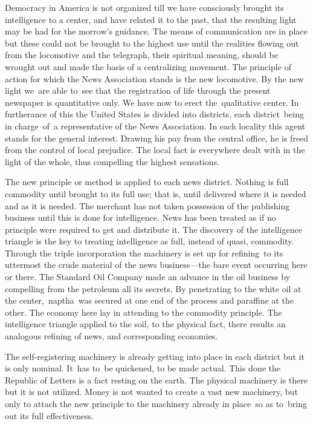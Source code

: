 \documentclass[twoside,symmetric,nobib,justified]{tufte-book}
\begin{document}
Democracy in America is not organized till we have consciously brought
its intelligence to a center, and have related it to the past, that the
resulting light may be had for the morrow's guidance. The means of
communication are in place but these could not be brought to the highest
use until the realities flowing out from the locomotive and the
telegraph, their spiritual meaning, should be wrought out and made the
basis of a centralizing movement. The principle of action for which the
News Association stands is the new locomotive. By the new light we~are
able to~see that the registration of life through the present newspaper
is quantitative only. We have now to erect the~qualitative center. In
furtherance of this the United States is divided into districts, each
district~being in charge~of~a representative of the News Association. In
each locality this agent stands for the general interest. Drawing his
pay from the central office, he is freed from the control of local
prejudice. The local fact is everywhere dealt with in the light of the
whole, thus compelling the highest sensations. ~

The new principle or method is applied to each news district. Nothing is
full commodity until brought to its full use; that is, until delivered
where it is needed and as it is needed. The merchant has not taken
possession of the publishing business until this is done for
intelligence. News has been treated as if no principle were required to
get and distribute it. The discovery of the intelligence triangle is the
key to treating intelligence as full, instead of quasi, commodity.
Through the triple incorporation the machinery is set up for refining~to
its uttermost the crude material of the news business---the bare event
occurring here or there. The Standard Oil Company made an advance in the
oil business by compelling from the petroleum all its secrets. By
penetrating to the white oil at the center,~naptha~was secured at one
end of the process and paraffine at the other. The economy here lay in
attending to the commodity principle. The intelligence triangle applied
to the soil, to the physical fact, there results an analogous refining
of news, and corresponding economies.~

The self-registering machinery is already getting into place in each
district but it is only nominal. It~has to~be quickened, to be made
actual. This done the Republic of Letters is a fact resting on the
earth. The physical machinery is there but it is not utilized. Money is
not wanted to create a vast new machinery, but only to attach the new
principle to the machinery already in place~so as to~bring out its full
effectiveness.~
\end{document}
